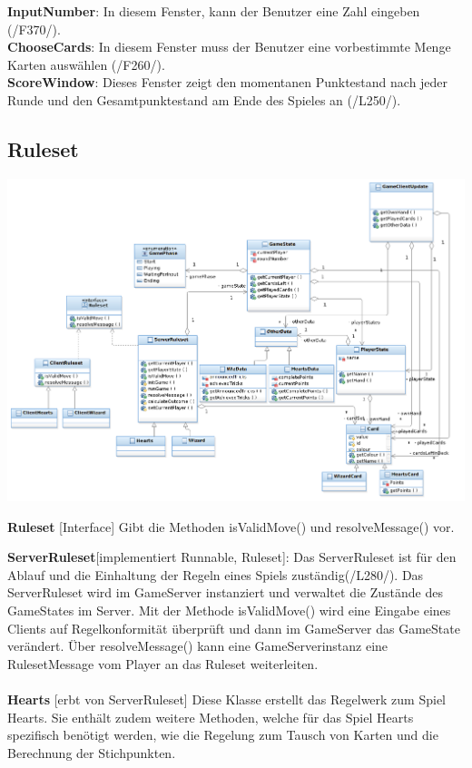 \documentclass{article}
\begin{document}
\textbf{InputNumber}: In diesem Fenster, kann der Benutzer eine Zahl eingeben (/F370/). \\

\textbf{ChooseCards}: In diesem Fenster muss der Benutzer eine vorbestimmte Menge Karten auswählen (/F260/). \\

\textbf{ScoreWindow}: Dieses Fenster zeigt den momentanen Punktestand nach jeder Runde und den Gesamtpunktestand am Ende des Spieles an (/L250/).\\


\subsection{Ruleset}
\includegraphics[width=\textwidth]{Entwurf_RulesetDiagram}

\textbf{Ruleset} [Interface] Gibt die Methoden isValidMove() und resolveMessage() vor.

\textbf{ServerRuleset}[implementiert Runnable, Ruleset]: Das ServerRuleset  ist für den Ablauf und die Einhaltung der Regeln eines Spiels zuständig(/L280/). Das ServerRuleset wird im GameServer instanziert und verwaltet die Zustände des GameStates im Server. Mit der Methode isValidMove() wird eine Eingabe eines Clients auf Regelkonformität überprüft und dann im GameServer  das GameState verändert. Über resolveMessage() kann eine GameServerinstanz eine RulesetMessage vom Player an das Ruleset weiterleiten. \\ \\
		
\textbf{Hearts} [erbt von ServerRuleset]  Diese Klasse erstellt das Regelwerk zum Spiel Hearts. Sie enthält zudem weitere Methoden, welche für das Spiel Hearts spezifisch benötigt werden, wie die Regelung zum Tausch von Karten und die Berechnung der Stichpunkten. \\ \\
		
\end{document}
